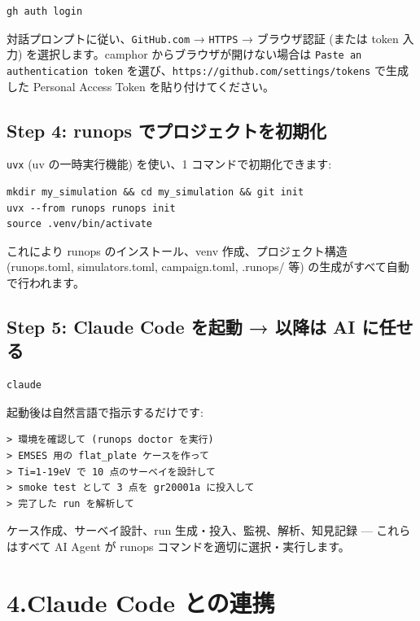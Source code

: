 \documentclass[a4paper,11pt]{article}
\begin{document}
\begin{lstlisting}
gh auth login
\end{lstlisting}

対話プロンプトに従い、\texttt{GitHub.com} → \texttt{HTTPS} → ブラウザ認証 (または token 入力) を選択します。camphor からブラウザが開けない場合は \texttt{Paste an authentication token} を選び、\texttt{https://github.com/settings/tokens} で生成した Personal Access Token を貼り付けてください。

\subsection*{\color{accent} Step 4: runops でプロジェクトを初期化}

\texttt{uvx} (uv の一時実行機能) を使い、1 コマンドで初期化できます:

\begin{lstlisting}
mkdir my_simulation && cd my_simulation && git init
uvx --from runops runops init
source .venv/bin/activate
\end{lstlisting}

これにより runops のインストール、venv 作成、プロジェクト構造 (runops.toml, simulators.toml, campaign.toml, .runops/ 等) の生成がすべて自動で行われます。

\subsection*{\color{accent} Step 5: Claude Code を起動 → 以降は AI に任せる}

\begin{lstlisting}
claude
\end{lstlisting}

起動後は自然言語で指示するだけです:

\begin{lstlisting}[language={},commentstyle={}]
> 環境を確認して (runops doctor を実行)
> EMSES 用の flat_plate ケースを作って
> Ti=1-19eV で 10 点のサーベイを設計して
> smoke test として 3 点を gr20001a に投入して
> 完了した run を解析して
\end{lstlisting}

ケース作成、サーベイ設計、run 生成・投入、監視、解析、知見記録 --- これらはすべて AI Agent が runops コマンドを適切に選択・実行します。

\section*{\color{darkblue} 4.\quad Claude Code との連携}
\end{document}
